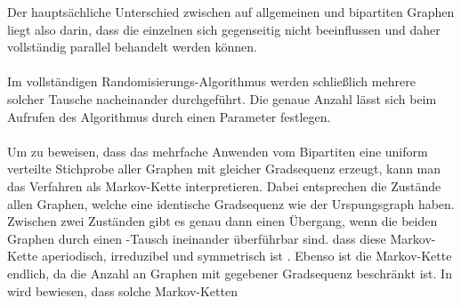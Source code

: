 Der hauptsächliche Unterschied zwischen \gc{} auf allgemeinen und bipartiten Graphen liegt also darin, 
dass die einzelnen  sich gegenseitig nicht beeinflussen und daher vollständig parallel behandelt werden können.
\\
\\
Im vollständigen Randomisierungs-Algorithmus werden schließlich mehrere solcher \gc{} Tausche nacheinander
durchgeführt. Die genaue Anzahl lässt sich beim Aufrufen des Algorithmus durch einen Parameter festlegen.
\\
\\
Um zu beweisen, dass das mehrfache Anwenden vom Bipartiten \gc{} eine uniform verteilte
Stichprobe aller Graphen mit gleicher Gradsequenz erzeugt, kann man das Verfahren als Markov-Kette interpretieren.
Dabei entsprechen die Zustände allen Graphen, welche eine identische Gradsequenz wie der Urspungsgraph haben.
Zwischen zwei Zuständen gibt es genau dann einen Übergang, wenn die beiden Graphen durch einen
\gc{}-Tausch ineinander überführbar sind.  dass diese Markov-Kette
aperiodisch, irreduzibel und symmetrisch ist \cite{penschuck2020recent} . Ebenso ist die Markov-Kette endlich, da die Anzahl an
Graphen mit gegebener Gradsequenz beschränkt ist. In \cite{....?} wird bewiesen, dass solche
Markov-Ketten 






